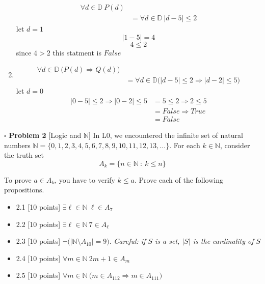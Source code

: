 \documentclass[11pt,twoside]{amsart}
\begin{document}
\begin{enumerate}[1)]
    \begin{align*}
      \forall d \in \mathbb{D} \ P(d) \\
      &= \forall d \in \mathbb{D} \ |d-5| \leq 2
    \end{align*}
    let $d = 1$ 
    $$|1-5| = 4$$
    $$4 \leq 2$$
    since $4 > 2$ this statment is $False$
  \item
    \begin{align*}
      \forall d \in \mathbb{D} \ \big ( P(d) \Rightarrow Q(d) \big ) \\
      &= \forall d \in \mathbb{D} \big ( |d - 5| \leq 2 \Rightarrow |d-2| \leq 5)
    \end{align*}
        let $d=0$ 
        \begin{align*}
          |0-5| \leq 2 \Rightarrow |0-2| \leq 5 &= 5 \leq 2 \Rightarrow 2\leq 5 \\
                                                &= False \Rightarrow True \\
                                                &= False
      \end{align*}
        

\end{enumerate}
 



\newpage
 \noindent $\square$ \textbf{Problem 2}  [\textsf{Logic and $\mathbb{N}$}] In \textsf{L0}, we encountered the infinite set of natural numbers $\mathbb{N} = \{0,1,2,3,4,5,6,7,8,9,10,11, 12, 13, \ldots\}$.  For each $k \in \mathbb{N}$, consider the truth set $$A_{k} = \{n \in \mathbb{N} \ : \ k \leq n\}$$
   
 
\noindent To prove $a \in A_k$, you have to verify $k \leq a$.  Prove each of the following propositions.  \begin{itemize}
  \itemsep0em 
  \item 2.1 [10 points] $\exists \ell \in \mathbb{N} \ \ell  \in A_7$
  \item 2.2 [10 points] $\exists \ell \in \mathbb{N} \ 7  \in A_{\ell}$
\item 2.3 [10 points] $\neg \big (| \mathbb{N} \setminus A_{10} | = 9 \big )$. \textit{Careful: if $S$ is a set, $|S|$ is the cardinality of $S$} 
\item 2.4 [10 points] $\forall m \in \mathbb{N} \ 2m+1 \in A_m$
\item 2.5 [10 points] $\forall m \in \mathbb{N} \ \big (m \in A_{112} \Rightarrow m \in A_{111} \big )$

 \end{itemize} 
\end{document}
